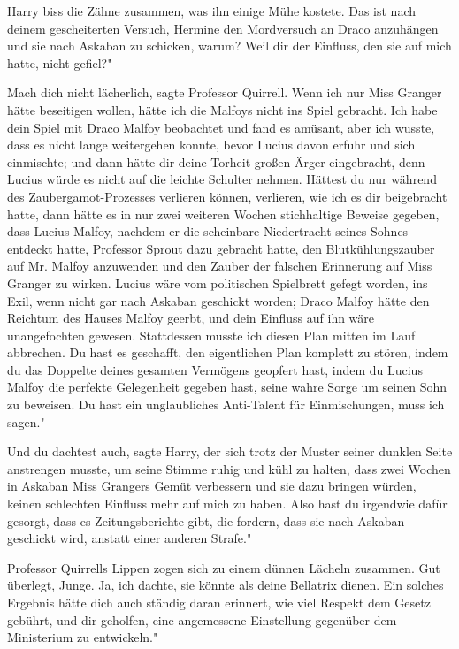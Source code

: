 Harry biss die Zähne zusammen, was ihn einige Mühe kostete. \glqq{}Das ist nach
deinem gescheiterten Versuch, Hermine den Mordversuch an Draco anzuhängen und
sie nach Askaban zu schicken, warum? Weil dir der Einfluss, den sie auf mich
hatte, nicht gefiel?"

\glqq{}Mach dich nicht lächerlich\grqq{}, sagte Professor Quirrell. \glqq{}Wenn
ich nur Miss Granger hätte beseitigen wollen, hätte ich die Malfoys nicht ins
Spiel gebracht. Ich habe dein Spiel mit Draco Malfoy beobachtet und fand es
amüsant, aber ich wusste, dass es nicht lange weitergehen konnte, bevor Lucius
davon erfuhr und sich einmischte; und dann hätte dir deine Torheit großen Ärger
eingebracht, denn Lucius würde es nicht auf die leichte Schulter nehmen. Hättest
du nur während des Zaubergamot-Prozesses verlieren können, verlieren, wie ich es
dir beigebracht hatte, dann hätte es in nur zwei weiteren Wochen stichhaltige
Beweise gegeben, dass Lucius Malfoy, nachdem er die scheinbare Niedertracht
seines Sohnes entdeckt hatte, Professor Sprout dazu gebracht hatte, den
Blutkühlungszauber auf Mr. Malfoy anzuwenden und den Zauber der falschen
Erinnerung auf Miss Granger zu wirken. Lucius wäre vom politischen Spielbrett
gefegt worden, ins Exil, wenn nicht gar nach Askaban geschickt worden; Draco
Malfoy hätte den Reichtum des Hauses Malfoy geerbt, und dein Einfluss auf ihn
wäre unangefochten gewesen. Stattdessen musste ich diesen Plan mitten im Lauf
abbrechen. Du hast es geschafft, den eigentlichen Plan komplett zu stören, indem
du das Doppelte deines gesamten Vermögens geopfert hast, indem du Lucius Malfoy
die perfekte Gelegenheit gegeben hast, seine wahre Sorge um seinen Sohn zu
beweisen. Du hast ein unglaubliches Anti-Talent für Einmischungen, muss ich
sagen."

\glqq{}Und du dachtest auch\grqq{}, sagte Harry, der sich trotz der Muster seiner
dunklen Seite anstrengen musste, um seine Stimme ruhig und kühl zu halten, \glqq
dass zwei Wochen in Askaban Miss Grangers Gemüt verbessern und sie dazu bringen
würden, keinen schlechten Einfluss mehr auf mich zu haben. Also hast du
irgendwie dafür gesorgt, dass es Zeitungsberichte gibt, die fordern, dass sie
nach Askaban geschickt wird, anstatt einer anderen Strafe."

Professor Quirrells Lippen zogen sich zu einem dünnen Lächeln zusammen. \glqq
Gut überlegt, Junge. Ja, ich dachte, sie könnte als deine Bellatrix dienen. Ein
solches Ergebnis hätte dich auch ständig daran erinnert, wie viel Respekt dem
Gesetz gebührt, und dir geholfen, eine angemessene Einstellung gegenüber dem
Ministerium zu entwickeln."

